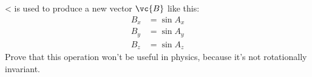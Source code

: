 <%
is used to produce a new vector $\vc{B}$ like this:
\begin{align*}
  B_x &= \sin A_x  \\
  B_y &= \sin A_y  \\
  B_z &= \sin A_z 
\end{align*}
Prove that this operation won't be useful in physics, because it's not
rotationally invariant. 
